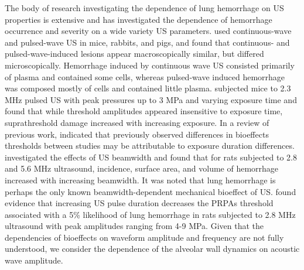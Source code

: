 The body of research investigating the dependence of lung hemorrhage
on \ac{US} properties is extensive and has investigated the dependence
of hemorrhage occurrence and severity on a wide variety \ac{US}
parameters. \cite{Zachary1995a} used continuous-wave and pulsed-wave
\ac{US} in mice, rabbits, and pigs, and found that continuous- and
pulsed-wave-induced lesions appear macroscopically similar, but
differed microscopically. Hemorrhage induced by continuous wave
\ac{US} consisted primarily of plasma and contained some cells,
whereas pulsed-wave induced hemorrhage was composed mostly of cells
and contained little plasma. \cite{Raeman1996} subjected mice to 2.3
MHz pulsed \ac{US} with peak pressures up to 3 MPa and varying
exposure time and found that while threshold amplitudes appeared
insensitive to exposure time, suprathreshold damage increased with
increasing exposure. In a review of previous work, \cite{Miller2016a}
indicated that previously observed differences in bioeffects
thresholds between studies may be attributable to exposure duration
differences. \cite{OBrien2001} investigated the effects of \ac{US}
beamwidth and found that for rats subjected to 2.8 and 5.6 MHz
ultrasound, incidence, surface area, and volume of hemorrhage
increased with increasing beamwidth. It was noted that lung hemorrhage
is perhaps the only known beamwidth-dependent mechanical bioeffect of
\ac{US}. \cite{OBrien2003c} found evidence that increasing \ac{US}
pulse duration decreases the \acp{PRPA} threshold associated with a
5\% likelihood of lung hemorrhage in rats subjected to 2.8 MHz
ultrasound with peak amplitudes ranging from 4-9 MPa. Given that the
dependencies of bioeffects on waveform amplitude and frequency are not
fully understood, we consider the dependence of the alveolar wall
dynamics on acoustic wave amplitude.

